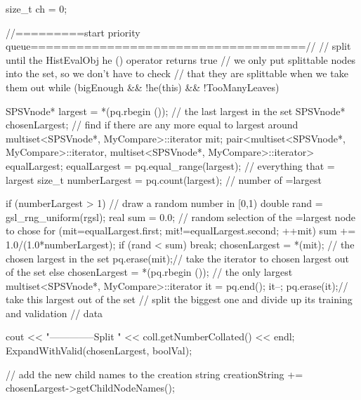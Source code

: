\begin{DoxyCode}
{{      size_t ch = 0;
      
        //=========start priority queue====================================//
        // split until the HistEvalObj he () operator returns true
        // we only put splittable nodes into the set, so we don't have to check
        // that they are splittable when we take them out   
      while (bigEnough && !he(this) && !TooManyLeaves) {          
            SPSVnode* largest = *(pq.rbegin ()); // the last largest in the set
            SPSVnode* chosenLargest;
            // find if there are any more equal to largest around
            multiset<SPSVnode*, MyCompare>::iterator mit;
            pair<multiset<SPSVnode*, MyCompare>::iterator,
                multiset<SPSVnode*, MyCompare>::iterator> equalLargest;
            equalLargest = pq.equal_range(largest); // everything that =
       largest
            size_t numberLargest = pq.count(largest); // number of =largest

            if (numberLargest > 1) {
                // draw a random number in [0,1)
                double rand = gsl_rng_uniform(rgsl);
                real sum = 0.0;
                // random selection of the =largest node to chose
                for (mit=equalLargest.first; mit!=equalLargest.second; ++mit) {
                    sum += 1.0/(1.0*numberLargest);
                    if (rand < sum) {
                        break;
                    }
                }
                chosenLargest = *(mit); // the chosen largest in the set
                pq.erase(mit);// take the iterator to chosen largest out of the
       set
            }
            else {
                chosenLargest = *(pq.rbegin ()); // the only largest
                multiset<SPSVnode*, MyCompare>::iterator it = pq.end();
                it--;
                pq.erase(it);// take this largest out of the set
            }
            // split the biggest one and divide up its training and validation 
            // data
            
            cout << "--------------Split " << coll.getNumberCollated() << endl;
            ExpandWithValid(chosenLargest, boolVal);
                          
            // add the new child names to the creation string
            creationString += chosenLargest->getChildNodeNames();

}}}
\end{DoxyCode}
